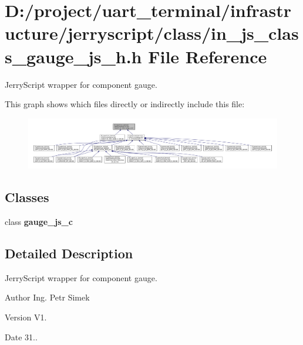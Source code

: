\section{D\+:/project/uart\+\_\+terminal/infrastructure/jerryscript/class/in\+\_\+js\+\_\+class\+\_\+gauge\+\_\+js\+\_\+h.h File Reference}
\label{in__js__class__gauge__js__h_8h}


Jerry\+Script wrapper for component gauge.  


This graph shows which files directly or indirectly include this file\+:
\nopagebreak
\begin{figure}[H]
\begin{center}
\leavevmode
\includegraphics[width=350pt]{in__js__class__gauge__js__h_8h__dep__incl}
\end{center}
\end{figure}
\subsection*{Classes}
\begin{DoxyCompactItemize}
\item 
class \textbf{ gauge\+\_\+js\+\_\+c}
\end{DoxyCompactItemize}


\subsection{Detailed Description}
Jerry\+Script wrapper for component gauge. 

\begin{DoxyAuthor}{Author}
Ing. Petr Simek 
\end{DoxyAuthor}
\begin{DoxyVersion}{Version}
V1. 
\end{DoxyVersion}
\begin{DoxyDate}{Date}
31.. 
\end{DoxyDate}

